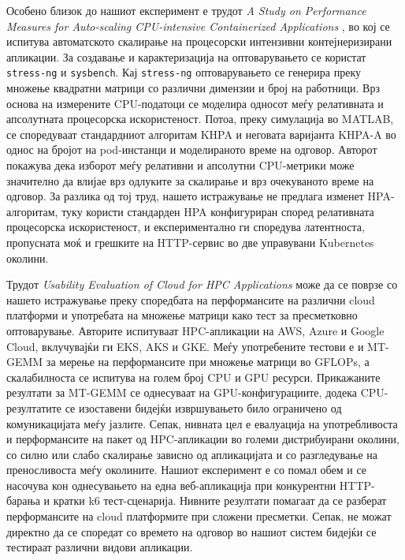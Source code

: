 \documentclass{article}
\begin{document}
Особено близок до нашиот експеримент е трудот \textit{A Study on Performance Measures for Auto-scaling CPU-intensive Containerized Applications} \cite{casalicchio2019}, во кој се испитува автоматското скалирање на процесорски интензивни контејнеризирани апликации. За создавање и карактеризација на оптоварувањето се користат \texttt{stress-ng} и \texttt{sysbench}. Кај \texttt{stress-ng} оптоварувањето се генерира преку множење квадратни матрици со различни димензии и број на работници. Врз основа на измерените CPU-податоци се моделира односот меѓу релативната и апсолутната процесорска искористеност. Потоа, преку симулација во MATLAB, се споредуваат стандардниот алгоритам KHPA и неговата варијанта KHPA-A во однос на бројот на pod-инстанци и моделираното време на одговор. Авторот покажува дека изборот меѓу релативни и апсолутни CPU-метрики може значително да влијае врз одлуките за скалирање и врз очекуваното време на одговор. За разлика од тој труд, нашето истражување не предлага изменет HPA-алгоритам, туку користи стандарден HPA конфигуриран според релативната процесорска искористеност, и експериментално ги споредува латентноста, пропусната моќ и грешките на HTTP-сервис во две управувани Kubernetes околини.

Трудот \textit{Usability Evaluation of Cloud for HPC Applications} \cite{sochat2025} може да се поврзе со нашето истражување преку споредбата на перформансите на различни cloud платформи и употребата на множење матрици како тест за пресметковно оптоварување. Авторите испитуваат HPC-апликации на AWS, Azure и Google Cloud, вклучувајќи ги EKS, AKS и GKE. Меѓу употребените тестови е и MT-GEMM за мерење на перформансите при множење матрици во GFLOPs, а скалабилноста се испитува на голем број CPU и GPU ресурси. Прикажаните резултати за MT-GEMM се однесуваат на GPU-конфигурациите, додека CPU-резултатите се изоставени бидејќи извршувањето било ограничено од комуникацијата меѓу јазлите. Сепак, нивната цел е евалуација на употребливоста и перформансите на пакет од HPC-апликации во големи дистрибуирани околини, со силно или слабо скалирање зависно од апликацијата и со разгледување на преносливоста меѓу околините. Нашиот експеримент е со помал обем и се насочува кон однесувањето на една веб-апликација при конкурентни HTTP-барања и кратки k6 тест-сценарија. Нивните резултати помагаат да се разберат перформансите на cloud платформите при сложени пресметки. Сепак, не можат директно да се споредат со времето на одговор во нашиот систем бидејќи се тестираат различни видови апликации.
\end{document}
